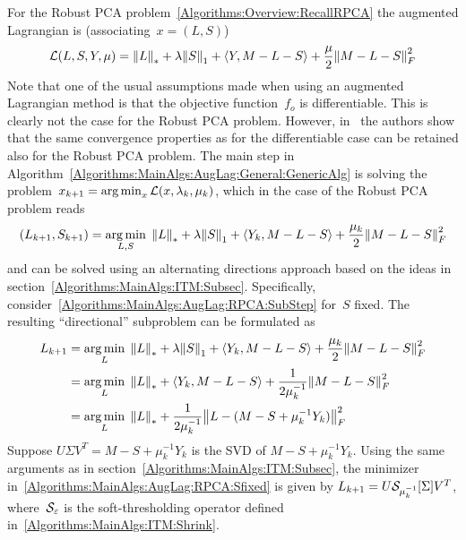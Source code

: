 \documentclass{../../common/projectreport}
\begin{document}
For the Robust PCA problem~\eqref{Algorithms:Overview:RecallRPCA} the augmented Lagrangian is (associating~$x = (L,S)$)
%
\begin{align}
{\mathcal{L}}(L,S,Y,\mu) = {\left\|L\right\|}_{*}^{} + \lambda {\left\|S\right\|}_{1}^{} + \langle Y, M-L-S \rangle + \frac{\mu}{2} {\left\|M-L-S\right\|}_{F}^{2}
\label{Algorithms:MainAlgs:AugLag:RPCA:AugLagr}
\end{align}
%
Note that one of the usual assumptions made when using an augmented Lagrangian method is that the objective function~$f_o$ is differentiable. This is clearly not the case for the Robust PCA problem. However, in~\cite{Lin:2010fk} the authors show that the same convergence properties as for the differentiable case can be retained also for the Robust PCA problem. The main step in Algorithm~\ref{Algorithms:MainAlgs:AugLag:General:GenericAlg} is solving the problem~$x_{k+1} = \operatorname*{arg\,min}_x {\mathcal{L}}(x,\lambda_k,\mu_k)$, which in the case of the Robust PCA problem reads
%
\begin{align}
(L_{k+1},S_{k+1}) = \operatorname*{arg\,min}_{L,S} \; {\left\|L\right\|}_{*}^{} + \lambda {\left\|S\right\|}_{1}^{} + \langle Y_k, M-L-S \rangle + \frac{\mu_k}{2} {\left\|M-L-S\right\|}_{F}^{2}
\label{Algorithms:MainAlgs:AugLag:RPCA:SubStep}
\end{align}
%
and can be solved using an alternating directions approach based on the ideas in section~\ref{Algorithms:MainAlgs:ITM:Subsec}. Specifically, consider~\eqref{Algorithms:MainAlgs:AugLag:RPCA:SubStep} for~$S$ fixed. The resulting ``directional'' subproblem can be formulated as
%
\begin{align}
\begin{split}
L_{k+1} &= \operatorname*{arg\,min}_{L} \; {\left\|L\right\|}_{*}^{} + \lambda {\left\|S\right\|}_{1}^{} + \langle Y_k, M-L-S \rangle + \frac{\mu_k}{2} {\left\|M-L-S\right\|}_{F}^{2} \\
&= \operatorname*{arg\,min}_{L} \; {\left\|L\right\|}_{*}^{} + \langle Y_k, M-L-S \rangle + \frac{1}{2\mu_k^{-1}} {\left\|M-L-S\right\|}_{F}^{2} \\
&= \operatorname*{arg\,min}_{L} \; {\left\|L\right\|}_{*}^{} + \frac{1}{2\mu_k^{-1}} {\left\|L-(M-S+\mu_k^{-1}Y_k)\right\|}_{F}^{2} 
\end{split}
\label{Algorithms:MainAlgs:AugLag:RPCA:Sfixed}
\end{align}
%
Suppose $U\Sigma V^T = M-S+\mu_k^{-1}Y_k$ is the SVD of $M-S+\mu_k^{-1}Y_k$. Using the same arguments as in section~\ref{Algorithms:MainAlgs:ITM:Subsec}, the minimizer in~\eqref{Algorithms:MainAlgs:AugLag:RPCA:Sfixed} is given by $L_{k+1} = U {\mathcal{S}}_{\mu_k^{-1}}[\Sigma] V^T$, where~${\mathcal{S}}_\varepsilon$ is the soft-thresholding operator defined in~\eqref{Algorithms:MainAlgs:ITM:Shrink}. 
\end{document}
